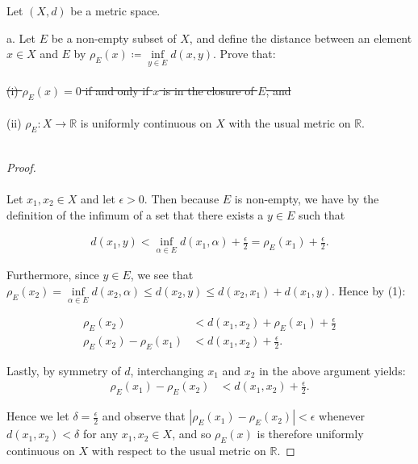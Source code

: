 Let $(X, d)$ be a metric space.

a.  Let $E$ be a non-empty subset of $X$, and define the distance between an
    element $x \in X$ and $E$ by
    $\rho_E(x) \coloneqq \inf\limits_{y \in E}{d(x, y)}$.  Prove that: \ \\\\
    \sout{(i) $\rho_E(x) = 0$ if and only if $x$ is in the closure of $E$, and} \ \\\\
    (ii) $\rho_E:X \to \mathbb{R}$ is uniformly continuous on $X$ with the usual metric on $\mathbb{R}$.\ \\\\

    \begin{proof}\ \\\\
        Let $x_1, x_2 \in X$ and let $\epsilon > 0$. Then because $E$ is non-empty, we have by the definition of the infimum
        of a set that there exists a $y \in E$ such that

        \begin{align}
            d(x_1, y) < \inf\limits_{\alpha \in E}{d(x_1, \alpha)} + \frac{\epsilon}{2} = \rho_E(x_1) + \frac{\epsilon}{2}.
        \end{align}
        
        Furthermore, since $y \in E$, we see that 
        $\rho_E(x_2) = \inf\limits_{\alpha \in E}{d(x_2, \alpha)} \le d(x_2, y) \le d(x_2, x_1) + d(x_1, y)$.
        Hence by (1):
        
        \begin{align*}
                          \rho_E(x_2) &< d(x_1, x_2) + \rho_E(x_1) + \frac{\epsilon}{2} \\
            \rho_E(x_2) - \rho_E(x_1) &< d(x_1, x_2) + \frac{\epsilon}{2}.
        \end{align*}

        Lastly, by symmetry of $d$, interchanging $x_1$ and $x_2$ in the above argument yields:
        \begin{align*}
            \rho_E(x_1) - \rho_E(x_2) &< d(x_1, x_2) + \frac{\epsilon}{2}.
        \end{align*}

        Hence we let $\delta = \frac{\epsilon}{2}$ and observe that $|\rho_E(x_1) - \rho_E(x_2)| < \epsilon$ whenever
         $d(x_1, x_2) < \delta$ for any $x_1, x_2 \in X$, and so $\rho_E(x)$ is therefore uniformly continuous on $X$ 
         with respect to the usual metric on $\mathbb{R}$.


    \end{proof}


